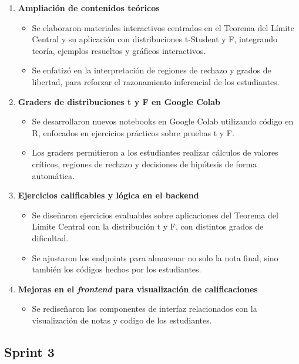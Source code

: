 \documentclass[letter,oneside,12pt,spanish]{report}
\begin{document}
\begin{enumerate}
	\item \textbf{Ampliación de contenidos teóricos}  
	\begin{itemize}
		\item Se elaboraron materiales interactivos centrados en el Teorema del Límite Central y su aplicación con distribuciones t-Student y F, integrando teoría, ejemplos resueltos y gráficos interactivos.
		\item Se enfatizó en la interpretación de regiones de rechazo y grados de libertad, para reforzar el razonamiento inferencial de los estudiantes.
	\end{itemize}
	
	\item \textbf{Graders de distribuciones t y F en Google Colab}  
	\begin{itemize}
		\item Se desarrollaron nuevos notebooks en Google Colab utilizando código en R, enfocados en ejercicios prácticos sobre pruebas t y F.
		\item Los graders permitieron a los estudiantes realizar cálculos de valores críticos, regiones de rechazo y decisiones de hipótesis de forma automática.
	\end{itemize}
	
	\item \textbf{Ejercicios calificables y lógica en el backend}  
	\begin{itemize}
		\item Se diseñaron ejercicios evaluables sobre aplicaciones del Teorema del Límite Central con la distribución t y F, con distintos grados de dificultad.
		\item Se ajustaron los endpoints para almacenar no solo la nota final, sino también los códigos hechos por los estudiantes.
	\end{itemize}
	
	\item \textbf{Mejoras en el \textit{frontend} para visualización de calificaciones}  
	\begin{itemize}
		\item Se rediseñaron los componentes de interfaz relacionados con la visualización de notas y codigo de los estudiantes.
	\end{itemize}
\end{enumerate}


\subsection{Sprint 3}
\end{document}
